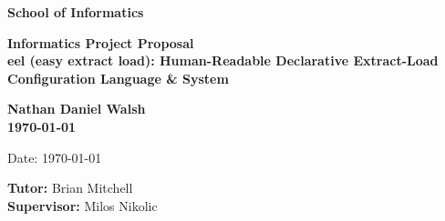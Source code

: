 \documentclass[a4paper,11pt]{article}
\newcommand{\examnumber}{Nathan Daniel Walsh}
\newcommand{\field}{eel (easy extract load): Human-Readable Declarative Extract-Load Configuration Language \& System}
\newcommand{\tutor}{Brian Mitchell}
\newcommand{\supervisor}{Milos Nikolic}
\begin{document}
\thispagestyle{empty}
\begin{minipage}[b]{110mm}
    {\Huge\bf School of Informatics
        \vspace*{17mm}}
\end{minipage}
\hfill
\begin{minipage}[t]{40mm}
\end{minipage}
\par\noindent
\vspace*{2cm}
\begin{center}
    \Large\bf Informatics Project Proposal \\
    \Large\bf \field
\end{center}
\vspace*{1.5cm}
\begin{center}
    \bf \examnumber\\
    \monthyeardate\today
\end{center}
\vspace*{5mm}

%
%                       
\begin{abstract}
    
\end{abstract}

\vspace*{1cm}

\vspace*{3cm}
Date: \today

\vfill
{\bf Tutor:} \tutor\\
{\bf Supervisor:} \supervisor
\newpage

\setcounter{page}{1}                            %
\footruleheight{1pt}
\headruleheight{1pt}
\rhead{- \thepage}
\cfoot{}
%

\listoffigures
\listoftables
\pagebreak

\tableofcontents
\pagebreak


\pagebreak

{\small
}
\end{document}
